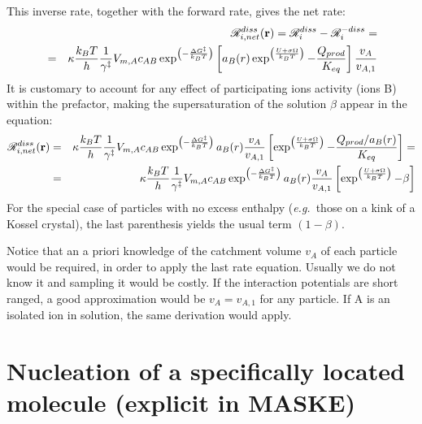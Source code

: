 \documentclass[12pt]{paper}    %
\newcommand{\RR}{\mathscr{R}}
\newcommand{\eg}{\textit{e.g.}~}
\begin{document}
This inverse rate, together with the forward rate, gives the net rate:
%
\begin{eqnarray}
&&\RR^{diss}_{i,net}({\bf r}) = \RR^{diss}_i -  \RR^{-diss}_i = \nonumber \\
& = & \kappa \frac{k_BT}{h} \frac{1}{\gamma^\ddag} V_{m,A} c_{AB}\exp^{\left( - \frac{\Delta G^\ddag}{k_BT}\right)} \left[a_B(r)  \exp^{\left( \frac{U + \sigma \Omega}{k_BT}\right)} - \frac{Q_{prod}}{K_{eq}} \right]  \frac{v_A}{v_{A,1}}
\end{eqnarray}
%
It is customary to account for any effect of participating ions activity (ions B) within the prefactor, making the supersaturation of the solution $\beta$ appear in the equation:
%
\begin{eqnarray}
\RR^{diss}_{i,net}({\bf r}) &=& \kappa \frac{k_BT}{h} \frac{1}{\gamma^\ddag} V_{m,A} c_{AB}\exp^{\left( - \frac{\Delta G^\ddag}{k_BT}\right)} a_B(r) \frac{v_A}{v_{A,1}}\left[ \exp^{\left( \frac{U + \sigma \Omega}{k_BT}\right)} - \frac{Q_{prod}/a_B(r) }{K_{eq}} \right] = \nonumber \\
&=&  \kappa \frac{k_BT}{h} \frac{1}{\gamma^\ddag} V_{m,A} c_{AB}\exp^{\left( - \frac{\Delta G^\ddag}{k_BT}\right)} a_B(r) \frac{v_A}{v_{A,1}} \left[ \exp^{\left( \frac{U + \sigma \Omega}{k_BT}\right)} - \beta \right] \label{eqRd5}
\end{eqnarray}
%
For the special case of particles with no excess enthalpy (\eg those on a kink of a Kossel crystal), the last parenthesis yields the usual term $(1-\beta)$.

Notice that an a priori knowledge of the catchment volume $v_A$ of each particle would be required, in order to apply the last rate equation. Usually we do not know it and sampling it would be costly. If the interaction potentials are short ranged, a good approximation would be $v_A = v_{A,1}$ for any particle. If A is an isolated ion in solution, the same derivation would apply.







\section{Nucleation of a specifically located molecule (explicit in MASKE)}
\end{document}
